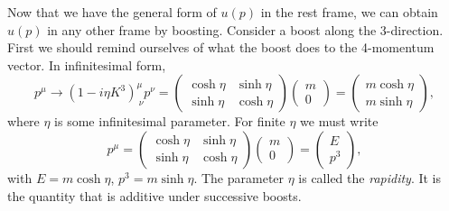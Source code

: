 Now that we have the general form of $u(p)$ in the rest frame, we can obtain
$u(p)$ in any other frame by boosting.  Consider a boost along the 3-direction.
First we should remind ourselves of what the boost does to the 4-momentum
vector.  In infinitesimal form,
\begin{equation}
  p^\mu \to (1 - i\eta K^3)^{\mu}_{\ \nu}p^\nu
    = \begin{pmatrix}
        \cosh\eta & \sinh\eta\\
        \sinh\eta & \cosh\eta
      \end{pmatrix}
      \begin{pmatrix}m\\ 0\end{pmatrix}
    = \begin{pmatrix}m\cosh\eta\\ m\sinh\eta\end{pmatrix},
\end{equation}
where $\eta$ is some infinitesimal parameter.  For finite $\eta$ we must write
\begin{equation}
  p^\mu = \begin{pmatrix}
    \cosh\eta & \sinh\eta\\
    \sinh\eta & \cosh\eta
  \end{pmatrix}
  \begin{pmatrix}m\\ 0\end{pmatrix}
  = \begin{pmatrix}
    E\\ p^3
  \end{pmatrix},
  \label{eq:3.50}
\end{equation}
with $E = m\cosh\eta$, $p^3 = m\sinh\eta$.  The parameter $\eta$ is called the
\emph{rapidity}.  It is the quantity that is additive under successive
boosts.

